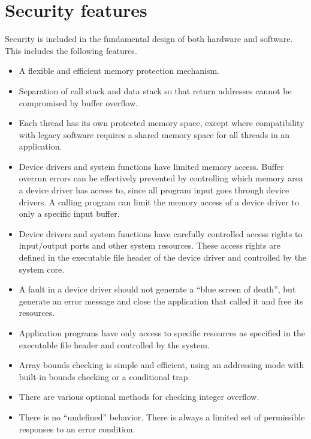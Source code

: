 \documentclass[forwardcom.tex]{subfiles}
\begin{document}
\section{Security features} \label{securityFeatures}
Security is included in the fundamental design of both hardware and software. This includes the following features.

\begin{itemize}
\item A flexible and efficient memory protection mechanism.

\item Separation of call stack and data stack so that return addresses cannot be compromised by buffer overflow.

\item Each thread has its own protected memory space, except where compatibility with legacy 
software requires a shared memory space for all threads in an application.

\item Device drivers and system functions have limited memory access. 
Buffer overrun errors can be effectively prevented by controlling which memory area a device driver has access to, since all program input goes through device drivers. A calling program can limit the memory access of a device driver to only a specific input buffer.

\item Device drivers and system functions have carefully controlled access rights to input/output ports and other system resources. These access rights are defined in the executable file header of the device driver and controlled by the system core.

\item A fault in a device driver should not generate a ``blue screen of death'', but generate an error message and close the application that called it and free its resources.

\item Application programs have only access to specific resources as specified in the executable file header and controlled by the system.

\item Array bounds checking is simple and efficient, using an addressing mode with built-in bounds checking or a conditional trap.

\item There are various optional methods for checking integer overflow.

\item There is no ``undefined'' behavior. There is always a limited set of permissible responses to an error condition.
\end{itemize}
\end{document}
